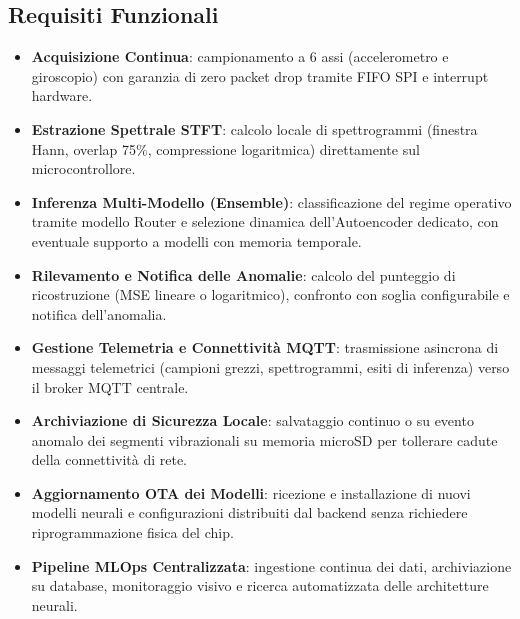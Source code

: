 \subsection{Requisiti Funzionali}
\begin{itemize}
	\item \textbf{Acquisizione Continua}: campionamento a 6 assi (accelerometro e giroscopio) con garanzia di zero packet drop tramite FIFO SPI e interrupt hardware.
	\item \textbf{Estrazione Spettrale STFT}: calcolo locale di spettrogrammi (finestra Hann, overlap 75\%, compressione logaritmica) direttamente sul microcontrollore.
	\item \textbf{Inferenza Multi-Modello (Ensemble)}: classificazione del regime operativo tramite modello Router e selezione dinamica dell'Autoencoder dedicato, con eventuale supporto a modelli con memoria temporale.
	\item \textbf{Rilevamento e Notifica delle Anomalie}: calcolo del punteggio di ricostruzione (MSE lineare o logaritmico), confronto con soglia configurabile e notifica dell'anomalia.
	\item \textbf{Gestione Telemetria e Connettività MQTT}: trasmissione asincrona di messaggi telemetrici (campioni grezzi, spettrogrammi, esiti di inferenza) verso il broker MQTT centrale.
	\item \textbf{Archiviazione di Sicurezza Locale}: salvataggio continuo o su evento anomalo dei segmenti vibrazionali su memoria microSD per tollerare cadute della connettività di rete.
	\item \textbf{Aggiornamento OTA dei Modelli}: ricezione e installazione di nuovi modelli neurali e configurazioni distribuiti dal backend senza richiedere riprogrammazione fisica del chip.
	\item \textbf{Pipeline MLOps Centralizzata}: ingestione continua dei dati, archiviazione su database, monitoraggio visivo e ricerca automatizzata delle architetture neurali.
\end{itemize}

